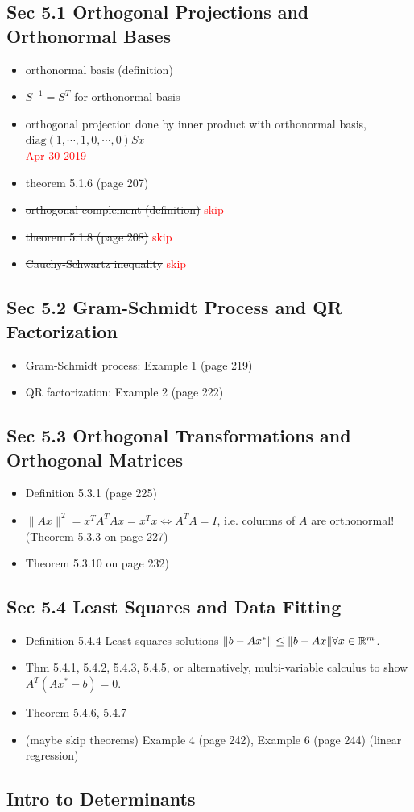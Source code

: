 \documentclass[12pt,a4paper]{article}
\newcommand{\red}[1]{\textcolor{red}{#1}}
\def\R{\ifmmode\mathbb R\fi}
\begin{document}
\subsection*{Sec 5.1 Orthogonal Projections and Orthonormal Bases}
\begin{itemize}
    \item orthonormal basis (definition)
    \item $S^{-1} = S^T$ for orthonormal basis
    \item orthogonal projection done by inner product with orthonormal basis, $\mbox{diag}(1, \cdots, 1, 0, \cdots, 0)Sx$
\red{\\Apr 30 2019}
    \item theorem 5.1.6 (page 207)
    \item \st{orthogonal complement (definition)} \red{skip}
    \item \st{theorem 5.1.8 (page 208)} \red{skip}
    \item \st{Cauchy-Schwartz inequality} \red{skip}
\end{itemize}

\subsection*{Sec 5.2 Gram-Schmidt Process and QR Factorization}
\begin{itemize}
    \item Gram-Schmidt process: Example 1 (page 219)
    \item QR factorization: Example 2 (page 222)
\end{itemize}

\subsection*{Sec 5.3 Orthogonal Transformations and Orthogonal Matrices}
\begin{itemize}
    \item Definition 5.3.1 (page 225)
    \item $\|Ax\|^2 = x^TA^TAx = x^Tx \Leftrightarrow A^TA = I$, i.e. columns of $A$ are orthonormal! (Theorem 5.3.3 on page 227)
    \item Theorem 5.3.10 on page 232)
\end{itemize}

\subsection*{Sec 5.4 Least Squares and Data Fitting}
\begin{itemize}
    \item Definition 5.4.4 Least-squares solutions $\|b-Ax^\ast\|\leq \|b-Ax\| \forall x\in \R^m$.
    \item Thm 5.4.1, 5.4.2, 5.4.3, 5.4.5, or alternatively, multi-variable calculus to show $A^T(Ax^\ast -b) = 0$.
    \item Theorem 5.4.6, 5.4.7
    \item (maybe skip theorems) Example 4 (page 242), Example 6 (page 244) (linear regression)
\end{itemize}

\subsection*{Intro to Determinants}
\end{document}
